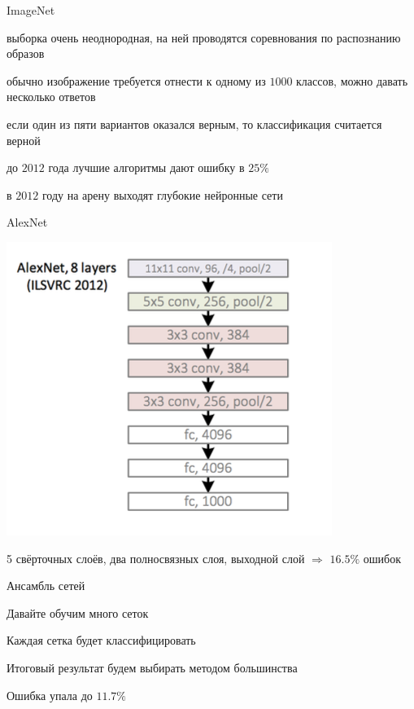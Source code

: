 \documentclass[notes,12pt, aspectratio=169]{beamer}
\newenvironment{wideitemize}{\itemize\addtolength{\itemsep}{10pt}}{\enditemize}
\begin{document}
\begin{frame}{ImageNet}
\begin{wideitemize}
\item  выборка очень неоднородная, на ней проводятся соревнования по распознанию образов

\item обычно изображение требуется отнести к одному из $1000$ классов, можно давать несколько ответов

\item если один из пяти вариантов оказался верным, то классификация считается верной

\item до $2012$ года лучшие алгоритмы дают ошибку в $25\%$

\item в $2012$ году на арену выходят глубокие нейронные сети
\end{wideitemize}
\end{frame}


\begin{frame}{AlexNet}
\begin{center}
\includegraphics[width=.3\linewidth]{alexnet.png}
\end{center}

\begin{wideitemize}
\item 5 свёрточных слоёв, два полносвязных слоя, выходной слой $\Rightarrow$ $16.5\%$ ошибок
\end{wideitemize}
\end{frame}


\begin{frame}{Ансамбль сетей}
\begin{wideitemize}
\item Давайте обучим много сеток

\item Каждая сетка будет классифицировать

\item Итоговый результат будем выбирать методом большинства

\item Ошибка упала до $11.7\%$
\end{wideitemize}
\end{frame}
\end{document}
